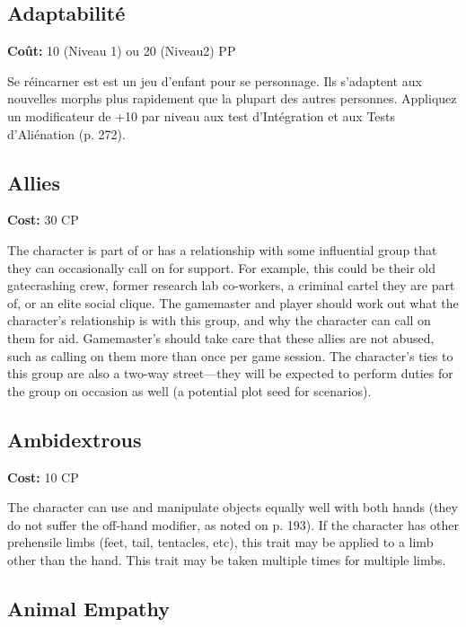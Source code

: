 \subsection{Adaptabilité} \label{sec:traits-adaptability} 

\textbf{Coût:} 10 (Niveau 1) ou 20 (Niveau2) PP 

Se réincarner est est un jeu d'enfant pour se personnage. Ils s'adaptent aux nouvelles morphs plus rapidement que la plupart des autres personnes. Appliquez un modificateur de +10 par niveau aux test d'Intégration et aux Tests d'Aliénation (p. 272). 

\subsection{Allies} \label{sec:traits-allies} 

\textbf{Cost:} 30 CP 

The character is part of or has a relationship with some influential group that they can occasionally call on for support. For example, this could be their old gatecrashing crew, former research lab co-workers, a criminal cartel they are part of, or an elite social clique. The gamemaster and player should work out what the character’s relationship is with this group, and why the character can call on them for aid. Gamemaster’s should take care that these allies are not abused, such as calling on them more than once per game session. The character’s ties to this group are also a two-way street—they will be expected to perform duties for the group on occasion as well (a potential plot seed for scenarios). 

\subsection{Ambidextrous} \label{sec:traits-ambidextrous} 

\textbf{Cost:} 10 CP 

The character can use and manipulate objects equally well with both hands (they do not suffer the off-hand modifier, as noted on p. 193). If the character has other prehensile limbs (feet, tail, tentacles, etc), this trait may be applied to a limb other than the hand. This trait may be taken multiple times for multiple limbs. 

\subsection{Animal Empathy} \label{sec:traits-animal-empathy} 

